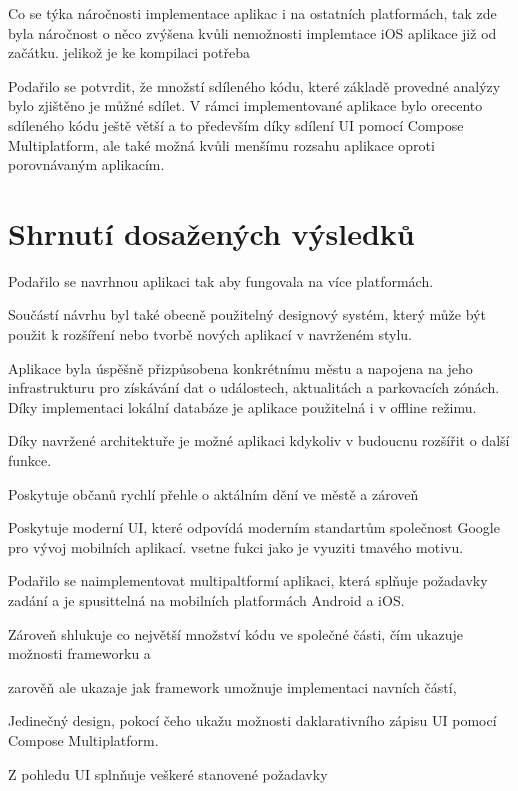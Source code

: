Co se týka náročnosti implementace aplikac i na ostatních platformách, tak zde byla náročnost
o něco zvýšena kvůli nemožnosti implemtace iOS aplikace již od začátku. jelikož je ke kompilaci potřeba 


Podařilo se potvrdit, že množstí sdíleného kódu, které základě provedné analýzy bylo zjištěno je můžné sdílet. V rámci implementované aplikace
bylo orecento sdíleného kódu ještě větší a to především díky sdílení UI pomocí Compose Multiplatform, ale také možná kvůli menšímu rozsahu
aplikace oproti porovnávaným aplikacím. 




\section{Shrnutí dosažených výsledků}
Podařilo se navrhnou aplikaci tak aby fungovala na více platformách.

Součástí návrhu byl také obecně použitelný designový systém, který může být použit k rozšíření nebo tvorbě nových aplikací v navrženém stylu.

Aplikace byla úspěšně přizpůsobena konkrétnímu městu a napojena na jeho infrastrukturu pro získávání dat o událostech, 
aktualitách a parkovacích zónách. Díky implementaci lokální databáze je aplikace použitelná i v offline režimu.

Díky navržené architektuře je možné aplikaci kdykoliv v budoucnu rozšířit o další funkce. 

Poskytuje občanů rychlí přehle o aktálním dění ve městě a zároveň 

Poskytuje moderní UI, které odpovídá moderním standartům společnost Google pro vývoj mobilních aplikací.
vsetne fukci jako je vyuziti tmavého motivu.

Podařilo se naimplementovat multipaltformí aplikaci, která splňuje požadavky zadání a je spusittelná na mobilních 
platformách Android a iOS. 

Zároveň shlukuje co největší množství kódu ve společné části, čím ukazuje možnosti frameworku a 

zarověň ale ukazaje jak framework umožnuje implementaci navních částí, 

Jedinečný design, pokocí čeho ukažu možnosti daklarativního zápisu UI pomocí Compose Multiplatform.

Z pohledu UI splnňuje veškeré stanovené požadavky

